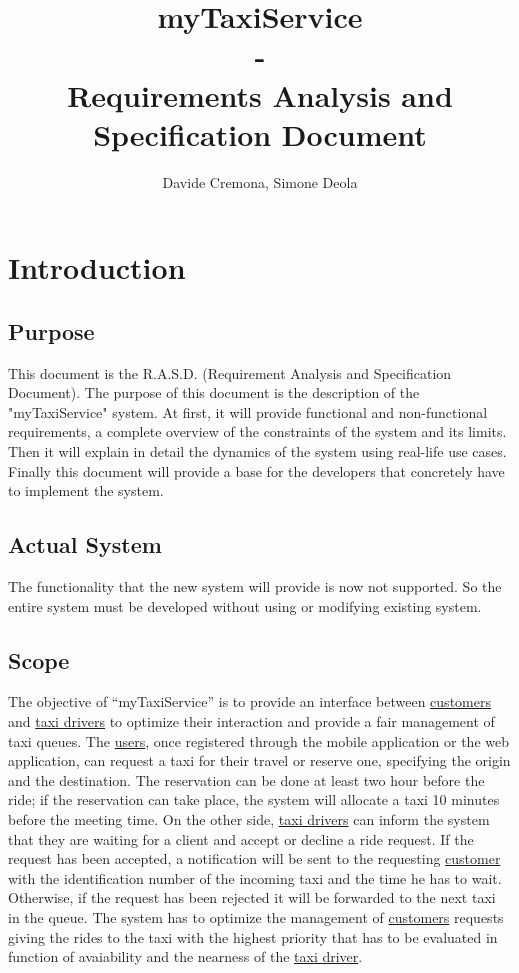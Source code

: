 \documentclass{report}
\begin{document}
\title{\textbf{myTaxiService} \\ -  \\ \textbf{Requirements Analysis and Specification Document}}
\author{Davide Cremona, Simone Deola}
\maketitle

\tableofcontents

\chapter{Introduction}

	\section{Purpose}
	This document is the R.A.S.D. (Requirement Analysis and Specification Document).
	The purpose of this document is the description of the "myTaxiService" system. 
	At first, it will provide functional and non-functional requirements, a complete overview of the constraints of the system and its limits. Then it will explain in detail the dynamics of the system using real-life use cases.
	Finally this document will provide a base for the developers that concretely have to implement the system.

	\section{Actual System}
	The functionality that the new system will provide is now not supported. 
	So the entire system must be developed without using or modifying existing system.

	\section{Scope}
	The objective of “myTaxiService” is to provide an interface between \hyperref[sec:customer]{customers} and \hyperref[sec:tdriver]{taxi drivers} to optimize their interaction and provide a fair management of taxi queues. The \hyperref[sec:normaluser]{users}, once registered through the mobile application or the web application, can request a taxi for their travel or reserve one, specifying the origin and the destination. The reservation can be done at least two hour before the ride; if the reservation can take place, the system will allocate a taxi 10 minutes before the meeting time.
	On the other side, \hyperref[sec:tdriver]{taxi drivers} can inform the system that they are waiting for a client and accept or decline a ride request. If the request has been accepted, a notification will be sent to the requesting \hyperref[sec:customer]{customer} with the identification number of the incoming taxi and the time he has to wait. Otherwise, if the request has been rejected it will be forwarded to the next taxi in the queue.
	The system has to optimize the management of \hyperref[sec:customer]{customers} requests giving the rides to the taxi with the highest priority that has to be evaluated in function of avaiability and the nearness of the \hyperref[sec:tdriver]{taxi driver}.
\end{document}
